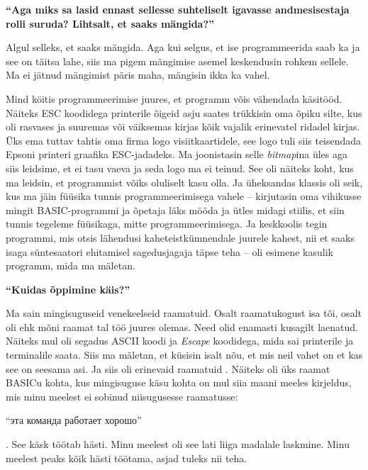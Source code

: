 \textbf{\enquote{Aga miks sa lasid ennast sellesse suhteliselt igavasse andmesisestaja rolli suruda? Lihtsalt, et saaks mängida?}}

Algul selleks, et saaks mängida. Aga kui selgus, et ise programmeerida saab ka ja see on täitsa lahe, siis ma pigem mängimise asemel keskendusin rohkem sellele. Ma ei jätnud mängimist päris maha, mängisin ikka ka vahel. 

Mind köitis programmeerimise juures, et programm võis vähendada käsitööd. Näiteks ESC koodidega printerile õigeid asju saates trükkisin oma õpiku silte, kus oli rasvases ja suuremas või väiksemas kirjas kõik vajalik erinevatel ridadel kirjas. Üks ema tuttav tahtis oma firma logo visiitkaartidele, see logo tuli siis teisendada Epsoni printeri graafika ESC-jadadeks. Ma joonistasin selle \emph{bitmap}ina üles aga siis leidsime, et ei tasu vaeva ja seda logo ma ei teinud. See oli näiteks koht, kus ma leidsin, et programmist võiks oluliselt kasu olla. Ja üheksandas klassis oli seik, kus ma jäin füüsika tunnis programmeerimisega vahele -- kirjutasin oma vihikusse mingit BASIC-programmi ja õpetaja läks mööda ja ütles midagi stiilis, et siin tunnis tegeleme füüsikaga, mitte programmeerimisega. Ja keskkoolis tegin programmi, mis otsis lähendusi kaheteistkümnendale juurele kahest, nii et saaks isaga süntesaatori ehitamisel sagedusjagaja täpse teha -- oli esimene kasulik programm, mida ma mäletan.

\textbf{\enquote{Kuidas õppimine käis?}}

Ma sain mingisuguseid venekeelseid raamatuid. Osalt raamatukogust isa tõi, osalt oli ehk mõni raamat tal töö juures olemas.  Need olid enamasti kusagilt laenatud. Näiteks mul oli segadus ASCII koodi ja \emph{Escape} koodidega, mida sai printerile ja terminalile saata. Siis ma mäletan, et küsisin isalt nõu, et mis neil vahet on et kas see on seesama asi. Ja siis oli erinevaid raamatuid . Näiteks oli üks raamat BASICu kohta, kus mingisuguse käsu kohta on mul siia maani meeles kirjeldus, mis minu meelest ei sobinud niisugusesse raamatusse: \begin{russian}\enquote{эта команда работает хорошо}\end{russian}. See käsk töötab hästi. Minu meelest oli see lati liiga madalale laskmine. Minu meelest peaks kõik hästi töötama, asjad tuleks nii teha. 

